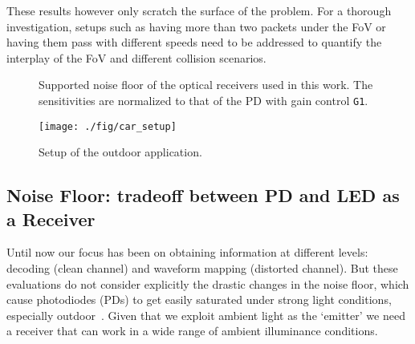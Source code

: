 \documentclass[10pt]{sig-alternate-05-2015}
\begin{document}
{These results however only scratch the surface of the problem. For a thorough investigation, setups such as having more than two packets under the FoV or having them pass with different speeds need to be addressed to quantify the interplay of the FoV and different collision scenarios. 



\begin{figure}[!t]
	\begin{minipage}[t]{0.57\linewidth}
		\vspace{-31.5mm}
		\caption{Supported noise floor of the optical receivers used in this work. The sensitivities are normalized to that of the PD with gain control {\tt G1}.}
		\label{fig_noise_floor} \vspace{-4mm}
	\end{minipage}\hfill \begin{minipage}[t]{.4\linewidth}
\centering
		\texttt{[image: ./fig/car\_setup]}
		\vspace{-2mm}
		\caption{Setup of the outdoor application.}
		\label{fig_setup_outdoor_app}
		\vspace{-4mm}
	\end{minipage} 
\end{figure}

\subsection{Noise Floor: tradeoff between PD and LED as a Receiver}\label{subsec:noise_floor}

Until now our focus has been on obtaining information  at different levels: decoding (clean channel) and waveform mapping (distorted channel). But these evaluations do not consider explicitly the drastic changes in the noise floor, which cause photodiodes (PDs) to get easily saturated under strong light conditions, especially outdoor~\cite{Liu:2011}. Given that we exploit ambient light as the `emitter'  we need a receiver that can work in a wide range of ambient illuminance conditions. 

}
\end{document}
